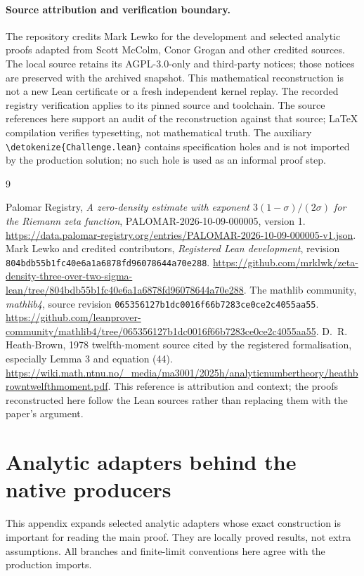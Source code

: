 \documentclass[11pt,a4paper]{article}
\numberwithin{equation}{section}
\theoremstyle{definition}
\newcommand{\lean}[1]{\ifmmode\text{\ttfamily\detokenize{#1}}\else\expandafter\nolinkurl\expandafter{\detokenize{#1}}\fi}
\begin{document}
\paragraph{Source attribution and verification boundary.}
The repository credits Mark Lewko for the development and selected analytic
proofs adapted from Scott McColm, Conor Grogan and other credited sources.
The local source retains its AGPL-3.0-only and third-party notices; those notices
are preserved with the archived snapshot. This mathematical reconstruction is
not a new Lean certificate or a fresh independent kernel replay. The recorded
registry verification applies to its pinned source and toolchain. The source
references here support an audit of the reconstruction against that source;
LaTeX compilation verifies typesetting, not mathematical truth. The auxiliary
\lean{Challenge.lean} contains specification holes and is not imported by the
production solution; no such hole is used as an informal proof step.

\begin{thebibliography}{9}
\raggedright
{}
Palomar Registry, \emph{A zero-density estimate with exponent
$3(1-\sigma)/(2\sigma)$ for the Riemann zeta function},
PALOMAR-2026-10-09-000005, version 1.
\url{https://data.palomar-registry.org/entries/PALOMAR-2026-10-09-000005-v1.json}.
Mark Lewko and credited contributors, \emph{Registered Lean development},
revision \texttt{804bdb55b1fc40e6a1a6878fd96078644a70e288}.
\url{https://github.com/mrklwk/zeta-density-three-over-two-sigma-lean/tree/804bdb55b1fc40e6a1a6878fd96078644a70e288}.
The mathlib community, \emph{mathlib4}, source revision
\texttt{065356127b1dc0016f66b7283ce0ce2c4055aa55}.
\url{https://github.com/leanprover-community/mathlib4/tree/065356127b1dc0016f66b7283ce0ce2c4055aa55}.
D.~R. Heath-Brown, 1978 twelfth-moment source cited by the registered
formalisation, especially Lemma 3 and equation (44).
\url{https://wiki.math.ntnu.no/_media/ma3001/2025h/analyticnumbertheory/heathbrowntwelfthmoment.pdf}.
This reference is attribution and context; the proofs reconstructed here follow
the Lean sources rather than replacing them with the paper's argument.
\end{thebibliography}
\appendix
\section{Analytic adapters behind the native producers}
\label{app:adapters}
This appendix expands selected analytic adapters whose exact construction is
important for reading the main proof. They are locally proved results, not
extra assumptions. All branches and finite-limit conventions here agree with
the production imports.
\end{document}

